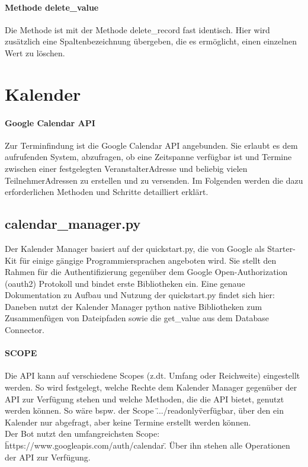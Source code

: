             \paragraph{Methode delete\_value}
                Die Methode ist mit der Methode delete\_record fast identisch. Hier wird zusätzlich eine Spaltenbezeichnung übergeben, die es ermöglicht, einen einzelnen Wert zu löschen.


    \section{Kalender} 
        \label{Kalender}
        \paragraph{Google Calendar API}
            Zur Terminfindung ist die Google Calendar API angebunden. \cite{GoogleCloudConsole} Sie erlaubt es dem aufrufenden System, abzufragen, ob eine Zeitspanne verfügbar ist und Termine zwischen einer festgelegten Veranstalter\-Adresse und beliebig vielen Teilnehmer\-Adressen zu erstellen und zu versenden. \cite{googleCalAPI} Im Folgenden werden die dazu erforderlichen Methoden und Schritte detailliert erklärt.

        \subsection{calendar\_manager.py}
            Der Kalender Manager basiert auf der quickstart.py, die von Google als Starter-Kit für einige gängige Programmiersprachen angeboten wird. Sie stellt den Rahmen für die Authentifizierung gegenüber dem Google Open-Authorization (oauth2) Protokoll und bindet erste Bibliotheken ein. Eine genaue Dokumentation zu Aufbau und Nutzung der quickstart.py findet sich hier: \cite{pythonQuickstart} \\
            Daneben nutzt der Kalender Manager python native Bibliotheken zum Zusammenfügen von Dateipfaden sowie die get\_value aus dem Database Connector.

            \paragraph{SCOPE}
                Die API kann auf verschiedene Scopes (z.dt. Umfang oder Reichweite) eingestellt werden. So wird festgelegt, welche Rechte dem Kalender Manager gegenüber der API zur Verfügung stehen und welche Methoden, die die API bietet, genutzt werden können. So wäre bspw. der Scope \".../readonly\" verfügbar, über den ein Kalender nur abgefragt, aber keine Termine erstellt werden können.\\
                Der Bot nutzt den umfangreichsten Scope: \"https://www.googleapis.com/auth/calendar\". Über ihn stehen alle Operationen der API zur Verfügung.

